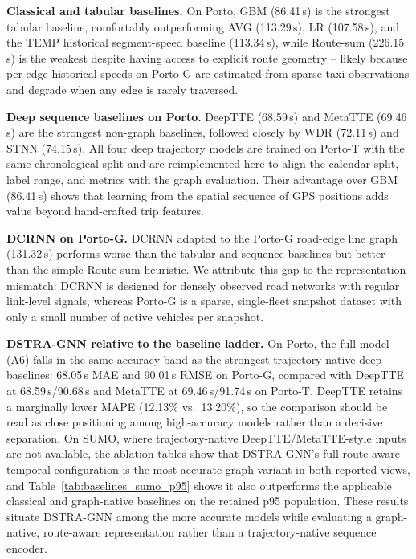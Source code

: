 \documentclass[pdflatex,sn-basic,Numbered]{sn-jnl}%
\begin{document}
\textbf{Classical and tabular baselines.} On Porto, GBM (86.41\,s) is the strongest tabular baseline, comfortably outperforming AVG (113.29\,s), LR (107.58\,s), and the TEMP historical segment-speed baseline (113.34\,s), while Route-sum (226.15\,s) is the weakest despite having access to explicit route geometry -- likely because per-edge historical speeds on Porto-G are estimated from sparse taxi observations and degrade when any edge is rarely traversed.

\textbf{Deep sequence baselines on Porto.} DeepTTE (68.59\,s) and MetaTTE (69.46\,s) are the strongest non-graph baselines, followed closely by WDR (72.11\,s) and STNN (74.15\,s). All four deep trajectory models are trained on Porto-T with the same chronological split and are reimplemented here to align the calendar split, label range, and metrics with the graph evaluation. Their advantage over GBM (86.41\,s) shows that learning from the spatial sequence of GPS positions adds value beyond hand-crafted trip features.

\textbf{DCRNN on Porto-G.} DCRNN adapted to the Porto-G road-edge line graph (131.32\,s) performs worse than the tabular and sequence baselines but better than the simple Route-sum heuristic. We attribute this gap to the representation mismatch: DCRNN is designed for densely observed road networks with regular link-level signals, whereas Porto-G is a sparse, single-fleet snapshot dataset with only a small number of active vehicles per snapshot.

\textbf{DSTRA-GNN relative to the baseline ladder.} On Porto, the full model (A6) falls in the same accuracy band as the strongest trajectory-native deep baselines: 68.05\,s MAE and 90.01\,s RMSE on Porto-G, compared with DeepTTE at 68.59\,s/90.68\,s and MetaTTE at 69.46\,s/91.74\,s on Porto-T. DeepTTE retains a marginally lower MAPE (12.13\% vs.\ 13.20\%), so the comparison should be read as close positioning among high-accuracy models rather than a decisive separation. On SUMO, where trajectory-native DeepTTE/MetaTTE-style inputs are not available, the ablation tables show that DSTRA-GNN's full route-aware temporal configuration is the most accurate graph variant in both reported views, and Table~\ref{tab:baselines_sumo_p95} shows it also outperforms the applicable classical and graph-native baselines on the retained p95 population. These results situate DSTRA-GNN among the more accurate models while evaluating a graph-native, route-aware representation rather than a trajectory-native sequence encoder.
\end{document}

